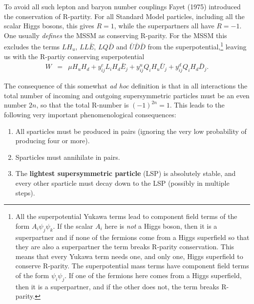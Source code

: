 \documentclass[notes.tex]{subfiles}
\begin{document}
To avoid all such lepton and baryon number couplings Fayet (1975) \cite{Fayet:1975ki} introduced the conservation of R-partity.
For all Standard Model particles, including all the scalar Higgs bosons, this gives $R=1$, while the superpartners all have $R=-1$. One usually {\it defines} the MSSM as conserving R-parity. For the MSSM this excludes the terms $L H_u$, $LL\bar{E}$, $LQ\bar{D}$ and $\bar{U}\bar{D} \bar{D}$ from the superpotential,\footnote{All the superpotential Yukawa terms lead to component field terms of the form $A_i\psi_j\psi_k$. If the scalar $A_i$ here is {\it not} a Higgs boson, then it is a superpartner and if none of the fermions come from a Higgs superfield so that they are also a superpartner the term breaks R-parity conservation. This means that every Yukawa term needs one, and only one, Higgs superfield to conserve R-parity.  The superpotential mass terms have component field terms of the form $\psi_i\psi_j$. If one of the fermions here comes from a Higgs superfield, then it is a superpartner, and if the other does not, the term breaks R-parity.}
leaving us with the R-partiy conserving superpotential
\begin{eqnarray}
W &=& \mu H_u H_d + y^e_{ij}L_iH_d \bar{E}_j + y^u_{ij}Q_iH_u\bar{U}_j +  y^d_{ij}Q_iH_d\bar{D}_j.
\label{eq:RPCsuperpot}
\end{eqnarray}

The consequence of this somewhat {\it ad hoc} definition is that in all interactions the total number of incoming and outgoing supersymmetric particles must be an even number $2n$, so that the total R-number is $(-1)^{2n}=1$. This leads to the following very important phenomenological consequences:
\begin{enumerate}
\item All sparticles must be produced in pairs (ignoring the very low probability of producing four or more).
\item Sparticles must annihilate in pairs.
\item The {\bf lightest supersymmetric particle} (LSP) is absolutely stable, and every other sparticle must decay down to the LSP (possibly in multiple steps).
\end{enumerate}

\end{document}
